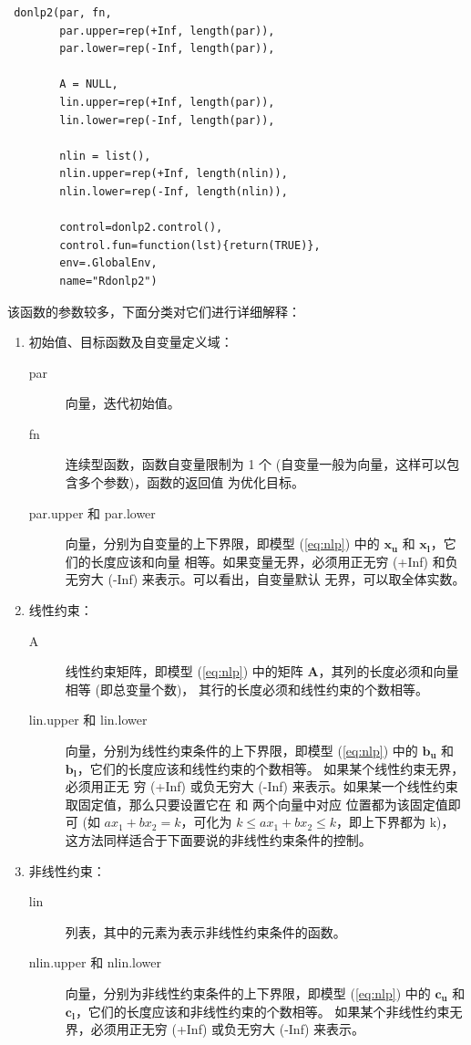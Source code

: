 \begin{verbatim}
 donlp2(par, fn,
        par.upper=rep(+Inf, length(par)),
        par.lower=rep(-Inf, length(par)),

        A = NULL,
        lin.upper=rep(+Inf, length(par)),
        lin.lower=rep(-Inf, length(par)),

        nlin = list(),
        nlin.upper=rep(+Inf, length(nlin)),
        nlin.lower=rep(-Inf, length(nlin)),

        control=donlp2.control(),
        control.fun=function(lst){return(TRUE)},
        env=.GlobalEnv,
        name="Rdonlp2")
\end{verbatim}

该函数的参数较多，下面分类对它们进行详细解释：
\begin{enumerate}
\item 初始值、目标函数及自变量定义域：
\begin{description}
\item [par] 向量，迭代初始值。
\item [fn] 连续型函数，函数自变量限制为 1 个 (自变量一般为向量，这样可以包含多个参数)，函数的返回值
                 为优化目标。
\item [par.upper 和 par.lower] 向量，分别为自变量的上下界限，即模型 (\ref{eq:nlp}) 中的
                 $\mathbf{x_u}$ 和 $\mathbf{x_l}$，它们的长度应该和向量  
                相等。如果变量无界，必须用正无穷 (+Inf) 和负无穷大 (-Inf) 来表示。可以看出，自变量默认
                无界，可以取全体实数。
\end{description}

\item 线性约束：
\begin{description}
\item [A]线性约束矩阵，即模型 (\ref{eq:nlp}) 中的矩阵 $\mathbf{A}$，其列的长度必须和向量  相等 (即总变量个数)，
            其行的长度必须和线性约束的个数相等。
\item [lin.upper 和 lin.lower]向量，分别为线性约束条件的上下界限，即模型 (\ref{eq:nlp}) 中的
                 $\mathbf{b_u}$ 和 $\mathbf{b_l}$，它们的长度应该和线性约束的个数相等。
                如果某个线性约束无界，必须用正无
                穷 (+Inf) 
                或负无穷大 (-Inf) 来表示。如果某一个线性约束取固定值，那么只要设置它在  和
                  两个向量中对应
                位置都为该固定值即可 (如 $ax_1+bx_2=k$，可化为 $k\leqslant ax_1+bx_2 \leqslant k$，即上下界都为 k)，
                这方法同样适合于下面要说的非线性约束条件的控制。
\end{description}
\item 非线性约束：
\begin{description}
\item [lin]列表，其中的元素为表示非线性约束条件的函数。
\item [nlin.upper 和 nlin.lower]向量，分别为非线性约束条件的上下界限，即模型 (\ref{eq:nlp}) 中的
                 $\mathbf{c_u}$ 和 $\mathbf{c_l}$，它们的长度应该和非线性约束的个数相等。
                如果某个非线性约束无界，必须用正无穷 (+Inf) 
                或负无穷大 (-Inf) 来表示。
\end{description}


\end{enumerate}
